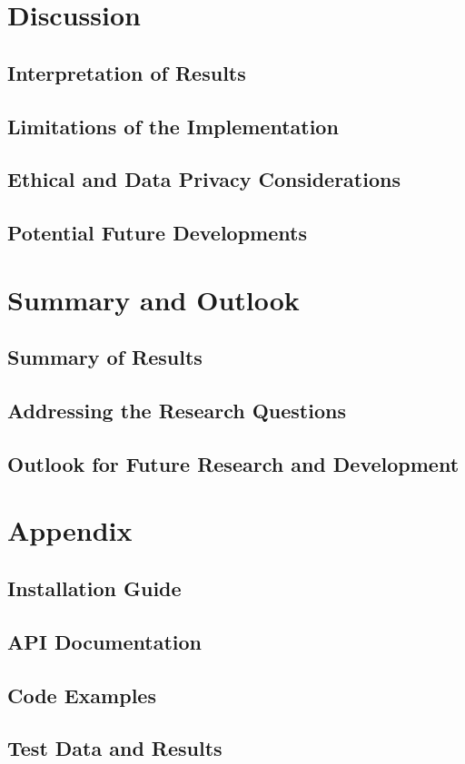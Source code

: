 \documentclass{article}
\begin{document}
\section{Discussion}

\subsection{Interpretation of Results}
\subsection{Limitations of the Implementation}
\subsection{Ethical and Data Privacy Considerations}
\subsection{Potential Future Developments}

\newpage

\section{Summary and Outlook}

\subsection{Summary of Results}
\subsection{Addressing the Research Questions}
\subsection{Outlook for Future Research and Development}

\newpage

\newpage

\appendix
\section*{Appendix}
\subsection*{Installation Guide}
\subsection*{API Documentation}
\subsection*{Code Examples}
\subsection*{Test Data and Results}

\nocite{*}



\end{document}

